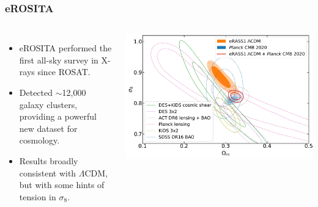 \documentclass[aspectratio=169]{beamer}
\begin{document}
\begin{frame}
    \frametitle{eROSITA}
    \begin{columns}
        \begin{itemize}
            \item eROSITA performed the first all-sky survey in X-rays since ROSAT.
            \item Detected $\sim$12,000 galaxy clusters, providing a powerful new dataset for cosmology.
            \item Results broadly consistent with $\Lambda$CDM, but with some hints of tension in $\sigma_8$. \hfill {}
        \end{itemize}
        \includegraphics[width=\textwidth]{figures/eROSITA.pdf}
    \end{columns}
\end{frame}
\end{document}
